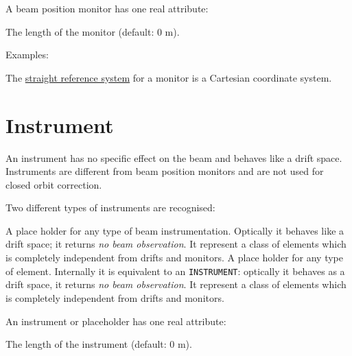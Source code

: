 
A beam position monitor has one real attribute: 
\begin{madlist}
    The length of the monitor (default: 0 m). 
\end{madlist}

Examples: 

The \hyperref[subsec:local-straight]{straight reference system} for a
monitor is a Cartesian coordinate system.  

\section{Instrument}
\label{sec:instrument}
An instrument has no specific effect on the beam and behaves like a
drift space. 
Instruments are different from beam position monitors and are not used
for closed orbit correction. 

Two different types of instruments are recognised:  

\begin{madlist}
    A place holder for any type of beam
     instrumentation. Optically it behaves like a drift space; it
     returns \emph{no beam observation}. It represent a class of
     elements which is completely independent from drifts and monitors.  
    A place holder for any type of
     element. Internally it is equivalent to an \texttt{INSTRUMENT}: 
     optically it behaves as a drift space, it returns 
     \emph{no beam observation}. It represent a class of elements 
     which is completely independent from drifts and monitors. 
\end{madlist}


An instrument or placeholder has one real attribute: 
\begin{madlist}
    The length of the instrument (default: 0 m). 
\end{madlist}

